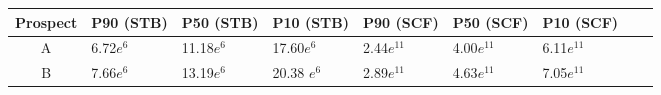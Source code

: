 \begin{tabularx}{\linewidth}{C *{8}{L}}
    \toprule
    Prospect &
    P90 (STB) &
    P50 (STB) &
    P10 (STB) &
    P90 (SCF) &
    P50 (SCF) &
    P10 (SCF) 
    \\
    
    \midrule
    A & 6.72$e^{6}$ & 11.18$e^{6}$ & 17.60$e^{6}$ & 2.44$e^{11}$ & 4.00$e^{11}$ & 6.11$e^{11}$ \\
    B & 7.66$e^{6}$ & 13.19$e^{6}$ & 20.38 $e^{6}$ & 2.89$e^{11}$ & 4.63$e^{11}$ & 7.05$e^{11}$ \\
    \bottomrule
\end{tabularx}